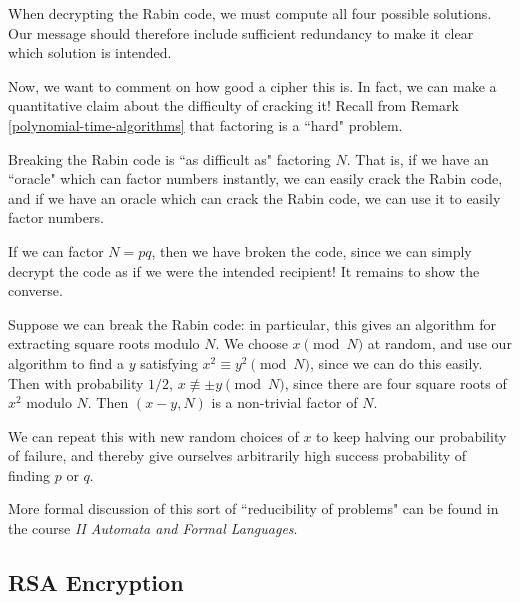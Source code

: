 \documentclass{article}
\begin{document}
\begin{corollary}
    When decrypting the Rabin code, we must compute all four possible solutions. Our message should therefore include sufficient redundancy to make it clear which solution is intended.
\end{corollary}

Now, we want to comment on how good a cipher this is. In fact, we can make a quantitative claim about the difficulty of cracking it! Recall from Remark \ref{polynomial-time-algorithms} that factoring is a ``hard" problem.

\begin{proposition}
    Breaking the Rabin code is ``as difficult as" factoring $N$. That is, if we have an ``oracle" which can factor numbers instantly, we can easily crack the Rabin code, and if we have an oracle which can crack the Rabin code, we can use it to easily factor numbers.
\end{proposition}

\begin{prf}
    If we can factor $N = pq$, then we have broken the code, since we can simply decrypt the code as if we were the intended recipient! It remains to show the converse.
    
    Suppose we can break the Rabin code: in particular, this gives an algorithm for extracting square roots modulo $N$. We choose $x \pmod N$ at random, and use our algorithm to find a $y$ satisfying $x^2 \equiv y^2 \pmod N$, since we can do this easily. Then with probability $1/2$, $x \not\equiv \pm y \pmod N$, since there are four square roots of $x^2$ modulo $N$. Then $(x-y, N)$ is a non-trivial factor of $N$.
    
    We can repeat this with new random choices of $x$ to keep halving our probability of failure, and thereby give ourselves arbitrarily high success probability of finding $p$ or $q$.
\end{prf}

\begin{note}
	More formal discussion of this sort of ``reducibility of problems" can be found in the course \textit{II Automata and Formal Languages}.
\end{note}


\subsection{RSA Encryption}
\label{section-cryptography-rsa}
\end{document}
